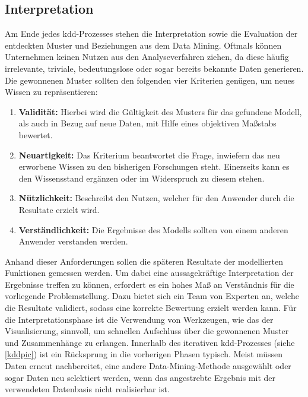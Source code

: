 \newpage
\subsection{Interpretation}
\label{int}
Am Ende jedes \gls{kdd}-Prozesses stehen die Interpretation sowie die Evaluation der entdeckten Muster und Beziehungen aus dem Data Mining. Oftmals können Unternehmen keinen Nutzen aus den Analyseverfahren ziehen, da diese häufig irrelevante, triviale, bedeutungslose oder sogar bereits bekannte Daten generieren. Die gewonnenen Muster sollten den folgenden vier Kriterien genügen, um neues Wissen zu repräsentieren:

\begin{enumerate}
\item \textbf{Validität:} Hierbei wird die Gültigkeit des Musters für das gefundene Modell, als auch in Bezug auf neue Daten, mit Hilfe eines objektiven Maßstabs bewertet.
\item \textbf{Neuartigkeit:} Das Kriterium beantwortet die Frage, inwiefern das neu erworbene Wissen zu den bisherigen Forschungen steht. Einerseits kann es den Wissensstand ergänzen oder im Widerspruch zu diesem stehen.
\item \textbf{Nützlichkeit:} Beschreibt den Nutzen, welcher für den Anwender durch die Resultate erzielt wird.
\item \textbf{Verständlichkeit:} Die Ergebnisse des Modells sollten von einem anderen Anwender verstanden werden.
\end{enumerate}

Anhand dieser Anforderungen sollen die späteren Resultate der modellierten Funktionen gemessen werden. Um dabei eine aussagekräftige Interpretation der Ergebnisse treffen zu können, erfordert es ein hohes Maß an Verständnis für die vorliegende Problemstellung. Dazu bietet sich ein Team von Experten an, welche die Resultate validiert, sodass eine korrekte Bewertung erzielt werden kann. Für die Interpretationsphase ist die Verwendung von Werkzeugen, wie das der Visualisierung, sinnvoll, um schnellen Aufschluss über die gewonnenen Muster und Zusammenhänge zu erlangen. Innerhalb des iterativen \gls{kdd}-Prozesses (siehe \vref{kddpic}) ist ein Rücksprung in die vorherigen Phasen typisch. Meist müssen Daten erneut nachbereitet, eine andere Data-Mining-Methode ausgewählt oder sogar Daten neu selektiert werden, wenn das  angestrebte Ergebnis mit der verwendeten Datenbasis nicht realisierbar ist.